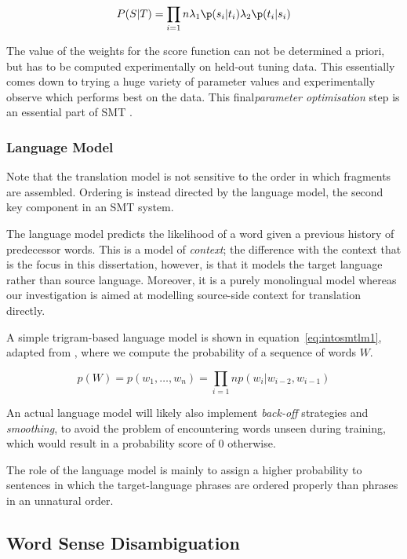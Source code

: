 \begin{equation}
P(S|T) = \prod_{i=1}{n} \lambda_1\p(s_i|t_i)\lambda_2\p(t_i|s_i)
\label{eq:introsmt3}
\end{equation}

The value of the weights for the score function can not be determined a priori,
but has to be computed experimentally on held-out tuning data. This essentially
comes down to trying a huge variety of parameter values and experimentally
observe which performs best on the data.  This final\emph{parameter
optimisation} step is an essential part of SMT \citep{MERT}.

\subsubsection{Language Model}

Note that the translation model is not sensitive to the order in which
fragments are assembled. Ordering is instead directed by the language model,
the second key component in an SMT system.

The language model predicts the likelihood of a word given a previous history
of predecessor words. This is a model of \emph{context}; the difference with
the context that is the focus in this dissertation, however, is that it models
the target language rather than source language. Moreover, it is a purely
monolingual model whereas our investigation is aimed at modelling source-side
context for translation directly.

A simple trigram-based language model is shown in equation~\ref{eq:intosmtlm1}, adapted from
\cite{Cole1997}, where we compute the probability of a sequence of words $W$.

\begin{equation}
p(W) = p(w_1,\ldots,w_n) = \prod_{i=1}{n} p(w_i|w_{i-2},w_{i-1})
\label{eq:introsmtlm1}
\end{equation}

An actual language model will likely also implement \emph{back-off} strategies and
\emph{smoothing}, to avoid the problem of encountering words unseen during
training, which would result in a probability score of $0$ otherwise. 

The role of the language model is mainly to assign a higher probability to
sentences in which the target-language phrases are ordered properly than
phrases in an unnatural order. 

\subsection{Word Sense Disambiguation}

